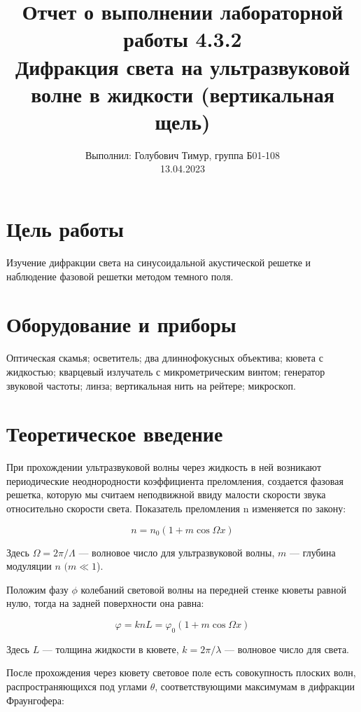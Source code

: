 \documentclass[12pt,a4paper]{article}
\author{\normalsize Выполнил: Голубович Тимур, группа Б01-108 \\
    	\normalsize 13.04.2023}
\date{}
\title{
    	\large Отчет о выполнении лабораторной работы 4.3.2 \\
    	\Large Дифракция света на ультразвуковой волне в жидкости (вертикальная щель)
     }
\begin{document}
    	\maketitle
    	
    \section*{Цель работы}
    Изучение дифракции света на синусоидальной акустической решетке и наблюдение фазовой решетки методом темного поля.
    
    \section*{Оборудование и приборы} 
    Оптическая скамья;
    осветитель;
    два длиннофокусных объектива;
    кювета с жидкостью;
    кварцевый излучатель с микрометрическим винтом;
    генератор звуковой частоты;
    линза;
    вертикальная нить на рейтере;
    микроскоп.

	
\section*{Теоретическое введение}

	При прохождении ультразвуковой волны через жидкость в ней возникают периодические неоднородности коэффициента преломления, создается фазовая решетка, которую мы считаем неподвижной ввиду малости скорости звука относительно скорости света. Показатель
	преломления n изменяется по закону:
	
	\begin{equation}
		n = n_0 (1 + m \cos \Omega x)
	\end{equation}
	
	Здесь $ \Omega = 2 \pi / \Lambda $ --- волновое число для ультразвуковой волны, $ m $ --- глубина модуляции $ n $ $ (m \ll 1 $).
	
	Положим фазу $ \phi $ колебаний световой волны на передней стенке кюветы равной нулю, тогда на задней поверхности она равна:
	
	\begin{equation}
		\varphi  = k n L = \varphi_0 (1 + m \cos \Omega x)
	\end{equation}
	
	Здесь $ L $ --- толщина жидкости в кювете, $ k = 2 \pi / \lambda $ --- волновое число для света.
	
	После прохождения через кювету световое поле есть совокупность плоских волн, распространяющихся под углами $ \theta $, соответствующими максимумам в дифракции Фраунгофера:
	
\end{document}
